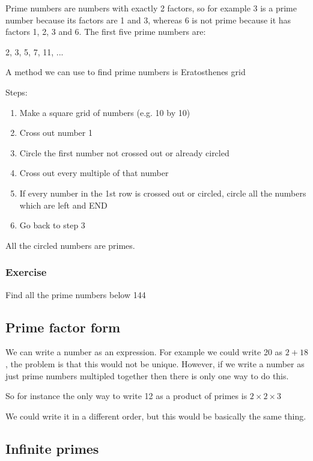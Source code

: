 Prime numbers are numbers with exactly 2 factors, so for example 3 is a prime number because its factors are 1 and 3, whereas 6 is not prime because it has factors 1, 2, 3 and 6.
The first five prime numbers are:

\bigskip

2, 3, 5, 7, 11, ...

\bigskip

A method we can use to find prime numbers is Eratosthenes grid

Steps:
\begin{enumerate}
  \item Make a square grid of numbers (e.g. 10 by 10)
  \item Cross out number 1
  \item Circle the first number not crossed out or already circled
  \item Cross out every multiple of that number
  \item If every number in the 1st row is crossed out or circled, circle all the numbers which are left and END
  \item Go back to step 3
\end{enumerate}

All the circled numbers are primes.

\subsubsection{Exercise}
Find all the prime numbers below 144

\subsection{Prime factor form}
We can write a number as an expression.  For example we could write 20 as $2 + 18$,  the problem is that this would not be unique.  However, if we write a number as just prime numbers multipled together then there is only one way to do this.

\bigskip

So for instance the only way to write 12 as a product of primes is $2 \times 2 \times 3$

We could write it in a different order, but this would be basically the same thing.
\subsection{Infinite primes}
